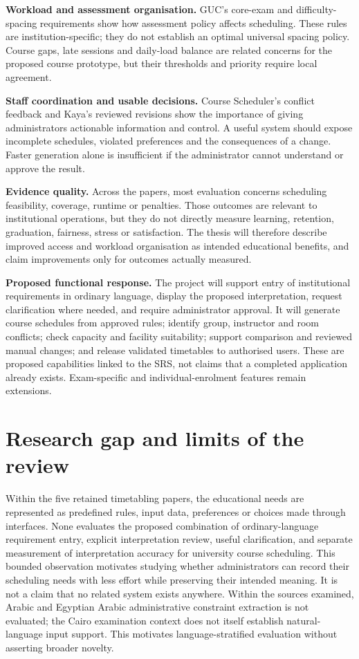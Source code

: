 \documentclass[
  11pt,a4paper,oneside]{report}
\begin{document}
\textbf{Workload and assessment organisation.} GUC's core-exam and difficulty-spacing requirements show how assessment policy affects scheduling. These rules are institution-specific; they do not establish an optimal universal spacing policy. Course gaps, late sessions and daily-load balance are related concerns for the proposed course prototype, but their thresholds and priority require local agreement.

\textbf{Staff coordination and usable decisions.} Course Scheduler's conflict feedback and Kaya's reviewed revisions show the importance of giving administrators actionable information and control. A useful system should expose incomplete schedules, violated preferences and the consequences of a change. Faster generation alone is insufficient if the administrator cannot understand or approve the result.

\textbf{Evidence quality.} Across the papers, most evaluation concerns scheduling feasibility, coverage, runtime or penalties. Those outcomes are relevant to institutional operations, but they do not directly measure learning, retention, graduation, fairness, stress or satisfaction. The thesis will therefore describe improved access and workload organisation as intended educational benefits, and claim improvements only for outcomes actually measured.

\textbf{Proposed functional response.} The project will support entry of institutional requirements in ordinary language, display the proposed interpretation, request clarification where needed, and require administrator approval. It will generate course schedules from approved rules; identify group, instructor and room conflicts; check capacity and facility suitability; support comparison and reviewed manual changes; and release validated timetables to authorised users. These are proposed capabilities linked to the SRS, not claims that a completed application already exists. Exam-specific and individual-enrolment features remain extensions.

\section{Research gap and limits of the review}
Within the five retained timetabling papers, the educational needs are represented as predefined rules, input data, preferences or choices made through interfaces. None evaluates the proposed combination of ordinary-language requirement entry, explicit interpretation review, useful clarification, and separate measurement of interpretation accuracy for university course scheduling. This bounded observation motivates studying whether administrators can record their scheduling needs with less effort while preserving their intended meaning. It is not a claim that no related system exists anywhere. Within the sources examined, Arabic and Egyptian Arabic administrative constraint extraction is not evaluated; the Cairo examination context does not itself establish natural-language input support. This motivates language-stratified evaluation without asserting broader novelty.
\end{document}
